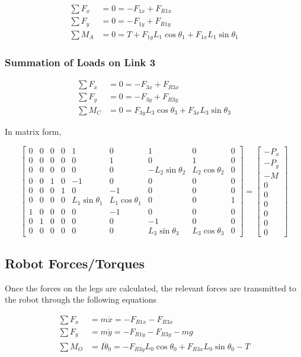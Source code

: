 \documentclass[letterpaper]{article}
\begin{document}
\begin{align*}
	\sum F_x &= 0 = -F_{1x} + F_{R1x} \\
	\sum F_y &= 0 = -F_{1y} + F_{R1y} \\
	\sum M_A &= 0 = T + F_{1y} L_1 \cos \theta_1 + F_{1x} L_1 \sin \theta_1
\end{align*}

\subsubsection{Summation of Loads on Link 3}

\begin{align*}
	\sum F_x &= 0 = -F_{3x} + F_{R3x} \\
	\sum F_y &= 0 = -F_{3y} + F_{R3y} \\
	\sum M_C &= 0 = F_{3y} L_3 \cos \theta_3 + F_{3x} L_3 \sin \theta_3
\end{align*}

\noindent In matrix form,

\begin{equation*}
\begin{bmatrix}
0 & 0 & 0 & 0 & 1 & 0 & 1 & 0 &0 \\ 
0 & 0 & 0 & 0 & 0 & 1 & 0 & 1 &0 \\
0 & 0 & 0 & 0 & 0 & 0 & -L_2 \sin \theta_2 & L_2 \cos \theta_2 & 0 \\
0 & 0 & 1 & 0 & -1 & 0 & 0 & 0 & 0 \\
0 & 0 & 0 & 1 & 0 & -1 & 0 & 0 & 0 \\
0 & 0 & 0 & 0 & L_1 \sin \theta_1 & L_1 \cos \theta_1 & 0 & 0 & 1\\
1 & 0 & 0 & 0 & 0 & -1 & 0 & 0 & 0 \\
0 & 1 & 0 & 0 & 0 & 0 & -1 & 0 & 0 \\
0 & 0 & 0 & 0 & 0 & 0 & L_3 \sin \theta_3 & L_3 \cos \theta_3 & 0
\end{bmatrix}
=
\begin{bmatrix} -P_x \\ - P_y \\ -M \\ 0 \\ 0 \\ 0 \\ 0 \\ 0 \\ 0 \end{bmatrix}
\end{equation*}

\subsection{Robot Forces/Torques}
Once the forces on the legs are calculated, the relevant forces are transmitted to the robot through the following equations

\begin{align*}
	\sum F_x &= m \ddot{x} = -F_{R1x} - F_{R3x}  \\
	\sum F_y &= m \ddot{y} = -F_{R1y} - F_{R3y} - mg \\
	\sum M_O &= I \ddot{\theta}_0 = -F_{R3y} L_0 \cos \theta_0 + F_{R3x} L_0 \sin \theta_0 - T
\end{align*}
\end{document}
